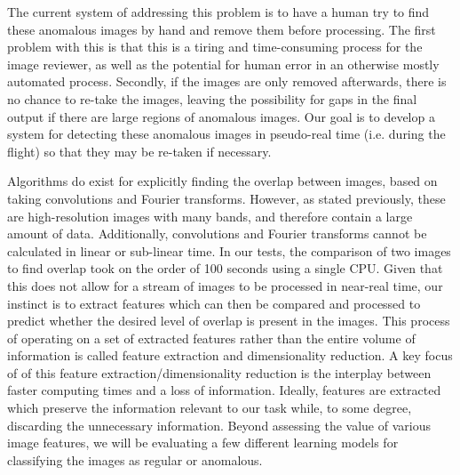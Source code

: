 The current system of addressing this problem is to have a human try to find these anomalous images by hand and remove them before processing.
The first problem with this is that this is a tiring and time-consuming process for the image reviewer, as well as the potential for human error in an otherwise mostly automated process.
Secondly, if the images are only removed afterwards, there is no chance to re-take the images, leaving the possibility for gaps in the final output if there are large regions of anomalous images.
Our goal is to develop a system for detecting these anomalous images in pseudo-real time (i.e. during the flight) so that they may be re-taken if necessary.

Algorithms do exist for explicitly finding the overlap between images, based on taking convolutions and Fourier transforms.
However, as stated previously, these are high-resolution images with many bands, and therefore contain a large amount of data.
Additionally, convolutions and Fourier transforms cannot be calculated in linear or sub-linear time.
In our tests, the comparison of two images to find overlap took on the order of 100 seconds using a single CPU.
Given that this does not allow for a stream of images to be processed in near-real time, our instinct is to extract features which can then be compared and processed to predict whether the desired level of overlap is present in the images.
This process of operating on a set of extracted features rather than the entire volume of information is called feature extraction and dimensionality reduction.
A key focus of of this feature extraction/dimensionality reduction is the interplay between faster computing times and a loss of information.
Ideally, features are extracted which preserve the information relevant to our task while, to some degree, discarding the unnecessary information.
Beyond assessing the value of various image features, we will be evaluating a few different learning models for classifying the images as regular or anomalous.




 

